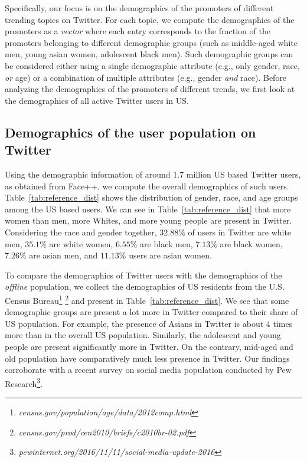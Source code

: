 \documentclass[letterpaper]{article}
\begin{document}
Specifically, our focus is on the demographics of the promoters
of different trending topics on Twitter.
For each topic, we compute the demographics of the promoters
as a {\it vector} where each entry corresponds to the fraction of
the promoters belonging to different demographic groups
(such as middle-aged white men, young asian women, adolescent black men).
Such demographic groups can be considered either using a single demographic
attribute (e.g., only gender, race, {\it or} age) or a combination
of multiple attributes (e.g., gender {\it and} race).
Before analyzing the demographics of the promoters of different trends, we first
look at the demographics of all active Twitter users in US.

\subsection{Demographics of the user population on Twitter}
\noindent
Using the demographic information of around $1.7$ million US based Twitter users, as obtained from Face++,
we compute the overall demographics of such users.
Table~\ref{tab:reference_dist} shows the distribution of gender, race, and age groups among the
US based users.
We can see in Table~\ref{tab:reference_dist} that more women than men, more Whites,
and more young people are present in Twitter. Considering the race and gender together,
 $32.88\%$ of users in Twitter are white men, $35.1\%$ are white women, $6.55\%$ are black men,
 $7.13\%$ are black women, $7.26\%$ are asian men, and $11.13\%$ users are asian women.

To compare the demographics of Twitter users with the
demographics of the {\it offline} population, we collect the demographics of US residents from the
U.S. Census Bureau\footnote{\it census.gov/population/age/data/2012comp.html}
\footnote{\it census.gov/prod/cen2010/briefs/c2010br-02.pdf} 
and present in Table~\ref{tab:reference_dist}.
We see that some demographic groups are present a lot more in Twitter compared to their share of US population.
For example, the presence of Asians in Twitter is about 4 times more than in the overall US population.
Similarly, the adolescent and young people are present significantly more in Twitter. On the contrary, mid-aged and old population
have comparatively much less presence in Twitter. Our findings corroborate with a recent survey on social media
population conducted by Pew Research\footnote{\it pewinternet.org/2016/11/11/social-media-update-2016}.
\end{document}
